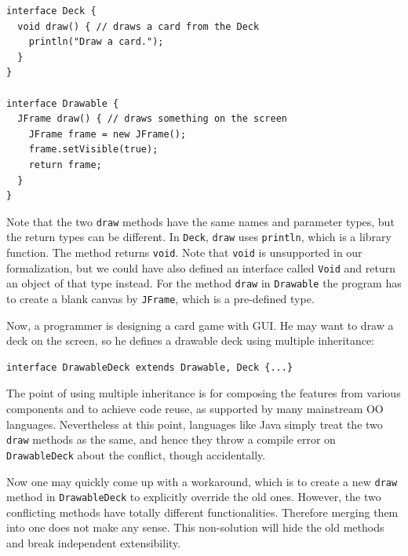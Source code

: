 \vspace{3pt}\begin{lstlisting}
interface Deck {
  void draw() { // draws a card from the Deck
    println("Draw a card.");
  }
}

interface Drawable {
  JFrame draw() { // draws something on the screen
    JFrame frame = new JFrame();
    frame.setVisible(true);
    return frame;
  }
}
\end{lstlisting}\vspace{3pt}
Note that the two \lstinline|draw| methods have the same names and parameter types,
but the return types can be different. In \lstinline|Deck|,
\lstinline|draw| uses \lstinline|println|, which is a
library function. 
The method returns \lstinline|void|. Note that \lstinline|void| is
unsupported in our formalization, but we could have also defined an interface called \lstinline|Void|
and return an object of that type instead. For the method \lstinline|draw| in
\lstinline|Drawable|
the program has to create a blank canvas by \lstinline|JFrame|, which
is a pre-defined type.

Now, a programmer is designing a
card game with GUI. He may want to draw a deck on the screen, so he defines a drawable
deck using multiple inheritance:

\vspace{3pt}\begin{lstlisting}
interface DrawableDeck extends Drawable, Deck {...} 
\end{lstlisting}\vspace{3pt}
The point of using multiple inheritance is for composing the features from various 
components and to achieve code reuse, as supported by many mainstream OO
languages. Nevertheless at this point, languages like Java simply treat the two \lstinline|draw| methods
as the same, and hence they throw a compile error on \lstinline|DrawableDeck| about the conflict, though accidentally.

Now one may quickly come up with a workaround, which is to create a new \lstinline|draw| method in \lstinline|DrawableDeck| to
explicitly override the old ones. However, the two conflicting methods
have totally different functionalities. Therefore merging
them into one does not make any sense. This non-solution will hide the
old methods and break independent extensibility. 

